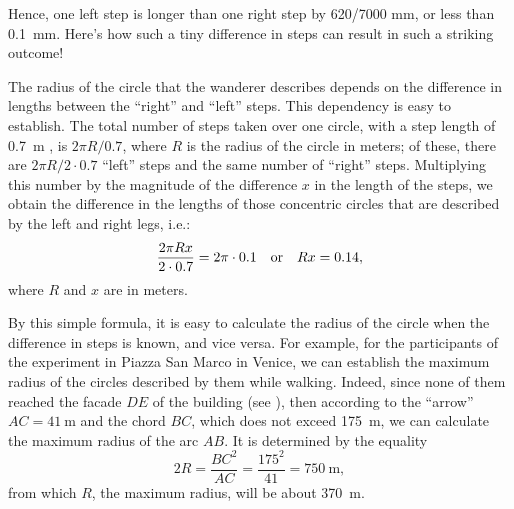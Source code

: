 Hence, one left step is longer than one right step by 620/7000 mm, or less than \SI{0.1}{\milli\meter}. Here's how such a tiny difference in steps can result in such a striking outcome!

The radius of the circle that the wanderer describes depends on the difference in lengths between the ``right'' and ``left'' steps. This dependency is easy to establish. The total number of steps taken over one circle, with a step length of \SI{0.7}{\meter} , is $2\pi R/0.7$, where $R$ is the radius of the circle in meters; of these, there are $2 \pi R/2 \cdot 0.7$ ``left'' steps and the same number of ``right'' steps. Multiplying this number by the magnitude of the difference $x$ in the length of the steps, we obtain the difference in the lengths of those concentric circles that are described by the left and right legs, i.e.:
\begin{equation*}%
\frac{2\pi Rx}{2 \cdot 0.7} = 2\pi \cdot 0.1 \qor Rx = 0.14,
\end{equation*}
where $R$ and $x$ are in meters.

By this simple formula, it is easy to calculate the radius of the circle when the difference in steps is known, and vice versa. For example, for the participants of the experiment in Piazza San Marco in Venice, we can establish the maximum radius of the circles described by them while walking. Indeed, since none of them reached the facade $DE$ of the building (see ), then according to the ``arrow'' $AC = \SI{41}{\meter}$ and the chord $BC$, which does not exceed \SI{175}{\meter}, we can calculate the maximum radius of the arc $AB$. It is determined by the equality
\begin{equation*}%
2R = \frac{BC^{2}}{AC} = \frac{175^{2}}{41} = \SI{750}{\meter}, 
\end{equation*}
from which $R$, the maximum radius, will be about \SI{370}{\meter}. 

